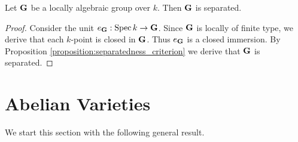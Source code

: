 \begin{corollary}\label{corollary:locally_algebraic_groups_are_separated}
Let $\mathbf{G}$ be a locally algebraic group over $k$. Then $\mathbf{G}$ is separated. 
\end{corollary}
\begin{proof}
Consider the unit $e_{\mathbf{G}}:\mathrm{Spec}\, k \rightarrow \mathbf{G}$. Since $\mathbf{G}$ is locally of finite type, we derive that each $k$-point is closed in $\mathbf{G}$. Thus $e_{\mathbf{G}}$ is a closed immersion. By Proposition \ref{proposition:separatedness_criterion} we derive that $\mathbf{G}$ is separated.
\end{proof}

\section{Abelian Varieties}
\noindent
We start this section with the following general result.

